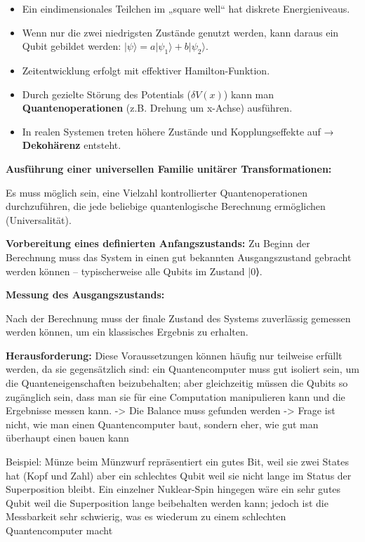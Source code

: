\begin{itemize}
    \item Ein eindimensionales Teilchen im „square well“ hat diskrete Energieniveaus.
    \item Wenn nur die zwei niedrigsten Zustände genutzt werden, kann daraus ein Qubit gebildet werden: $|\psi\rangle = a|\psi_1\rangle + b|\psi_2\rangle$.
    \item Zeitentwicklung erfolgt mit effektiver Hamilton-Funktion.
    \item Durch gezielte Störung des Potentials ($\delta V(x)$) kann man \textbf{Quantenoperationen} (z.B. Drehung um x-Achse) ausführen.
    \item In realen Systemen treten höhere Zustände und Kopplungseffekte auf → \textbf{Dekohärenz} entsteht.
\end{itemize}
 
 
 
    \item \textbf{Ausführung einer universellen Familie unitärer Transformationen:}

 Es muss möglich sein, eine Vielzahl kontrollierter Quantenoperationen durchzuführen, die jede beliebige quantenlogische Berechnung ermöglichen (Universalität).
 
    \item \textbf{Vorbereitung eines definierten Anfangszustands:}
 Zu Beginn der Berechnung muss das System in einen gut bekannten Ausgangszustand gebracht werden können – typischerweise alle Qubits im Zustand |0⟩.

    \item \textbf{Messung des Ausgangszustands:}

 Nach der Berechnung muss der finale Zustand des Systems zuverlässig gemessen werden können, um ein klassisches Ergebnis zu erhalten. 

\textbf{Herausforderung: }
Diese Voraussetzungen können häufig nur teilweise erfüllt werden, da sie gegensätzlich sind: ein Quantencomputer muss gut isoliert sein, um die Quanteneigenschaften beizubehalten; aber gleichzeitig müssen die Qubits so zugänglich sein, dass man sie für eine Computation manipulieren kann und die Ergebnisse messen kann. 
-> Die Balance muss gefunden werden
-> Frage ist nicht, wie man einen Quantencomputer baut, sondern eher, wie gut man überhaupt einen bauen kann

Beispiel: Münze beim Münzwurf repräsentiert ein gutes Bit, weil sie zwei States hat (Kopf und Zahl) aber ein schlechtes Qubit weil sie nicht lange im Status der Superposition bleibt. Ein einzelner Nuklear-Spin hingegen wäre ein sehr gutes Qubit weil die Superposition lange beibehalten werden kann; jedoch ist die Messbarkeit sehr schwierig, was es wiederum zu einem schlechten Quantencomputer macht

